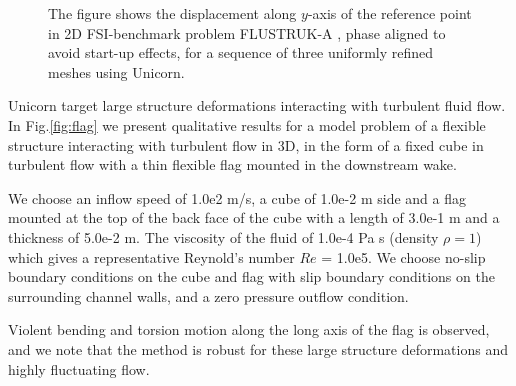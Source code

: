 \begin{figure}[!h]
\caption{
The figure shows the displacement along $y$-axis of the reference point in 2D FSI-benchmark problem FLUSTRUK-A  \cite{HoffmanJanssonStockli2011}, phase aligned to avoid start-up effects, for a sequence of three uniformly refined meshes using Unicorn.
}
\label{fig:flustruk}
\end{figure}

Unicorn target large structure deformations interacting with turbulent fluid flow. In Fig.\ref{fig:flag} we present qualitative results for a model problem of a flexible structure interacting
with turbulent flow in 3D, in the form of a fixed cube in turbulent flow with a thin flexible flag mounted in the downstream wake.

We choose an inflow speed of 1.0e2 m/s, a cube of 1.0e-2 m side and a flag mounted at the top of the back face of the cube with a length of 3.0e-1 m and a thickness of 5.0e-2 m. The viscosity of the fluid of 1.0e-4 Pa s (density $\rho=1$) which gives a representative Reynold's number $Re$ = 1.0e5. We choose no-slip boundary conditions on the cube and flag with slip boundary conditions on the surrounding channel walls, and a zero pressure outflow condition.

Violent bending and torsion motion along the long axis of the flag is observed, and we note that the
method is robust for these large structure deformations and highly fluctuating flow.


